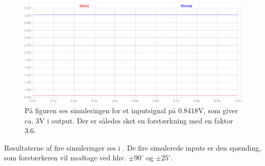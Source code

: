 \begin{figure}[H]
	\centering
	\includegraphics[scale=0.38]{figures/cProblemloesning/Forstaerker_faktor3_simulering.PNG}
	\caption{På figuren ses simuleringen for et inputsignal på $0.8418$V, som giver ca. $3$V i output. Der er således sket en forstærkning med en faktor $3.6$.}
	\label{fig:faktor3_simulering}
\end{figure}
\noindent Resultaterne af fire simuleringer ses i . De fire simulerede inputs er den spænding, som forstærkeren vil modtage ved hhv. $\pm90^{\circ}$ og $\pm25^{\circ}$.
